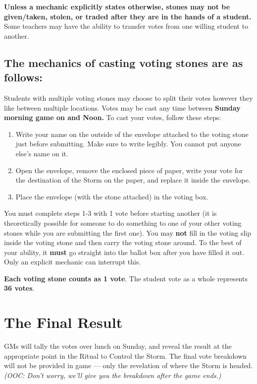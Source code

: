 \documentclass[green]{GL2020}
\begin{document}
\textbf{Unless a mechanic explicitly states otherwise, stones may not be given/taken, stolen, or traded after they are in the hands of a student.} Some teachers may have the ability to transfer votes from one willing student to another. 

\subsection*{The mechanics of casting voting stones are as follows:}

Students with multiple voting stones may choose to split their votes however they like between multiple locations. Votes may be cast any time between \textbf{Sunday morning game on and Noon.} To cast your votes, follow these steps:

\begin{enumerate}
  \item Write your name on the outside of the envelope attached to the voting stone just before submitting. Make sure to write legibly. You cannot put anyone else's name on it.
  \item Open the envelope, remove the enclosed piece of paper, write your vote for the destination of the Storm on the paper, and replace it inside the envelope.
  \item Place the envelope (with the stone attached) in the voting box.
\end{enumerate}

You must complete steps 1-3 with 1 vote before starting another (it is theoretically possible for someone to do something to one of your other voting stones while you are submitting the first one). You may \textbf{not} fill in the voting slip inside the voting stone and then carry the voting stone around. To the best of your ability, it \textbf{must} go straight into the ballot box after you have filled it out. Only an explicit mechanic can interrupt this.

\textbf{Each voting stone counts as 1 vote}. The student vote as a whole represents \textbf{36 votes}.

\section*{The Final Result}
GMs will tally the votes over lunch on Sunday, and reveal the result at the appropriate point in the Ritual to Control the Storm. The final vote breakdown will not be provided in game — only the revelation of where the Storm is headed. \emph{(OOC: Don't worry, we'll give you the breakdown after the game ends.)}
\end{document}
